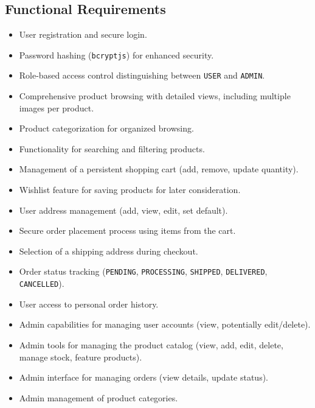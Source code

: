 \documentclass{article}
\begin{document}
\subsection{Functional Requirements}
\begin{itemize}[label=\textbullet]
    \item User registration and secure login.
    \item Password hashing (\texttt{bcryptjs}) for enhanced security.
    \item Role-based access control distinguishing between \texttt{USER} and \texttt{ADMIN}.
    \item Comprehensive product browsing with detailed views, including multiple images per product.
    \item Product categorization for organized browsing.
    \item Functionality for searching and filtering products.
    \item Management of a persistent shopping cart (add, remove, update quantity).
    \item Wishlist feature for saving products for later consideration.
    \item User address management (add, view, edit, set default).
    \item Secure order placement process using items from the cart.
    \item Selection of a shipping address during checkout.
    \item Order status tracking (\texttt{PENDING}, \texttt{PROCESSING}, \texttt{SHIPPED}, \texttt{DELIVERED}, \texttt{CANCELLED}).
    \item User access to personal order history.
    \item Admin capabilities for managing user accounts (view, potentially edit/delete).
    \item Admin tools for managing the product catalog (view, add, edit, delete, manage stock, feature products).
    \item Admin interface for managing orders (view details, update status).
    \item Admin management of product categories.
\end{itemize}
\end{document}
